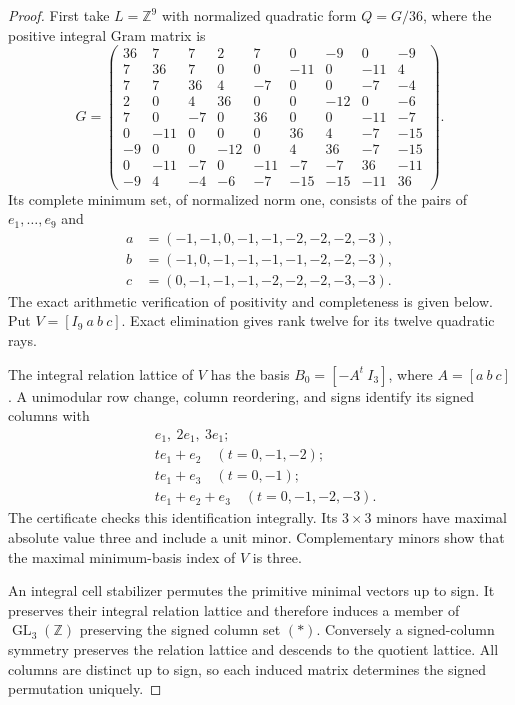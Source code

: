 \begin{proof}
First take $L=\mathbb Z^9$ with normalized quadratic form $Q=G/36$,
where the positive integral Gram matrix is
\begingroup
\setlength{\arraycolsep}{3pt}
\[
G=\begin{pmatrix}
36&7&7&2&7&0&-9&0&-9\\
7&36&7&0&0&-11&0&-11&4\\
7&7&36&4&-7&0&0&-7&-4\\
2&0&4&36&0&0&-12&0&-6\\
7&0&-7&0&36&0&0&-11&-7\\
0&-11&0&0&0&36&4&-7&-15\\
-9&0&0&-12&0&4&36&-7&-15\\
0&-11&-7&0&-11&-7&-7&36&-11\\
-9&4&-4&-6&-7&-15&-15&-11&36
\end{pmatrix}.
\]
\endgroup
Its complete minimum set, of normalized norm one, consists of the
pairs of $e_1,\ldots,e_9$ and
\begin{align*}
a&=(-1,-1,0,-1,-1,-2,-2,-2,-3),\\
b&=(-1,0,-1,-1,-1,-1,-2,-2,-3),\\
c&=(0,-1,-1,-1,-2,-2,-2,-3,-3).
\end{align*}
The exact arithmetic verification of positivity and completeness is
given below. Put $V=[I_9\ a\ b\ c]$. Exact elimination gives rank
twelve for its twelve quadratic rays.

The integral relation lattice of $V$ has the basis
$B_0=[-A^t\ I_3]$, where $A=[a\ b\ c]$. A unimodular row change,
column reordering, and signs identify its signed columns with
\[
\begin{split}
 &e_1,\ 2e_1,\ 3e_1;\\
 &te_1+e_2 \quad(t=0,-1,-2);\\
 &te_1+e_3 \quad(t=0,-1);\\
 &te_1+e_2+e_3 \quad(t=0,-1,-2,-3).
\end{split}
\tag{*}
\]
The certificate checks this identification integrally. Its
$3\times3$ minors have maximal absolute value three and include a
unit minor. Complementary minors show that the maximal minimum-basis
index of $V$ is three.

An integral cell stabilizer permutes the primitive minimal vectors
up to sign. It preserves their integral relation lattice and therefore
induces a member of $\operatorname{GL}_3(\mathbb Z)$ preserving the
signed column set $(\ast)$. Conversely a signed-column symmetry
preserves the relation lattice and descends to the quotient lattice.
All columns are distinct up to sign, so each induced matrix determines
the signed permutation uniquely.


\end{proof}
